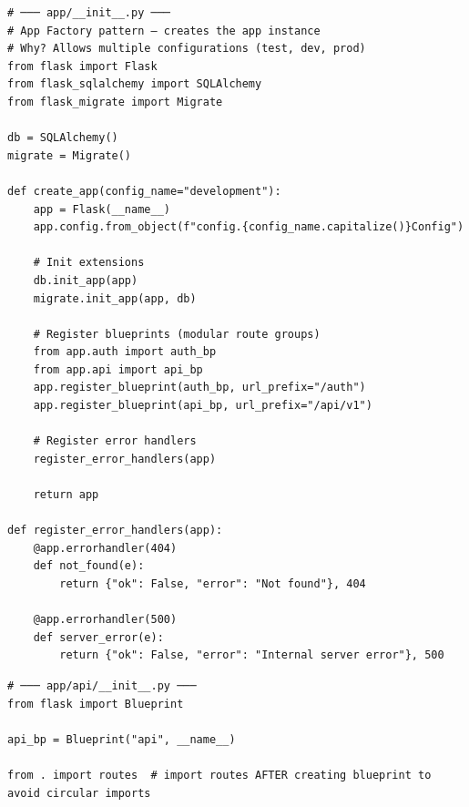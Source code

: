 \documentclass[10pt, a4paper]{article}
\begin{document}
\begin{lstlisting}[language=mypython]
# ─── app/__init__.py ───
# App Factory pattern — creates the app instance
# Why? Allows multiple configurations (test, dev, prod)
from flask import Flask
from flask_sqlalchemy import SQLAlchemy
from flask_migrate import Migrate

db = SQLAlchemy()
migrate = Migrate()

def create_app(config_name="development"):
    app = Flask(__name__)
    app.config.from_object(f"config.{config_name.capitalize()}Config")
    
    # Init extensions
    db.init_app(app)
    migrate.init_app(app, db)
    
    # Register blueprints (modular route groups)
    from app.auth import auth_bp
    from app.api import api_bp
    app.register_blueprint(auth_bp, url_prefix="/auth")
    app.register_blueprint(api_bp, url_prefix="/api/v1")
    
    # Register error handlers
    register_error_handlers(app)
    
    return app

def register_error_handlers(app):
    @app.errorhandler(404)
    def not_found(e):
        return {"ok": False, "error": "Not found"}, 404
    
    @app.errorhandler(500)
    def server_error(e):
        return {"ok": False, "error": "Internal server error"}, 500
\end{lstlisting}


\begin{lstlisting}[language=mypython]
# ─── app/api/__init__.py ───
from flask import Blueprint

api_bp = Blueprint("api", __name__)

from . import routes  # import routes AFTER creating blueprint to avoid circular imports
\end{lstlisting}
\end{document}
